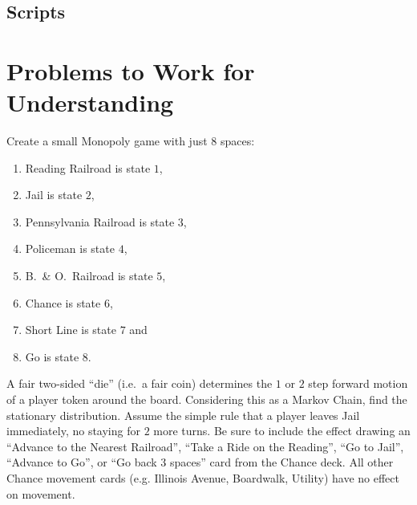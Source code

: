 \documentclass[12pt]{article}
\begin{document}
\subsection*{Scripts}



\hr

\section*{Problems to Work for Understanding}
\renewcommand{\theexerciseseries}{}
\renewcommand{\theexercise}{\arabic{exercise}}

\begin{exercise}
    Create a small Monopoly game with just \( 8 \) spaces:
    \begin{enumerate}
        \item
            Reading Railroad is state \( 1 \),
        \item
            Jail is state \( 2 \),
        \item
            Pennsylvania Railroad is state \( 3 \),
        \item
            Policeman is state \( 4 \),
        \item
            B.\ \& O.\ Railroad is state \( 5 \),
        \item
            Chance is state \( 6 \),
        \item
            Short Line is state \( 7 \) and
        \item
            Go is state \( 8 \).
    \end{enumerate}
    A fair two-sided ``die'' (i.e.\ a fair coin) determines the \( 1 \)
    or \( 2 \) step forward motion of a player token around the board.
    Considering this as a Markov Chain, find the stationary
    distribution.  Assume the simple rule that a player leaves Jail
    immediately, no staying for \( 2 \) more turns. Be sure to include
    the effect drawing an ``Advance to the Nearest Railroad'', ``Take a
    Ride on the Reading'', ``Go to Jail'', ``Advance to Go'', or ``Go
    back \( 3 \) spaces'' card from the Chance deck.  All other Chance
    movement cards (e.g. Illinois Avenue, Boardwalk, Utility) have no
    effect on movement.
\end{exercise}
\end{document}
